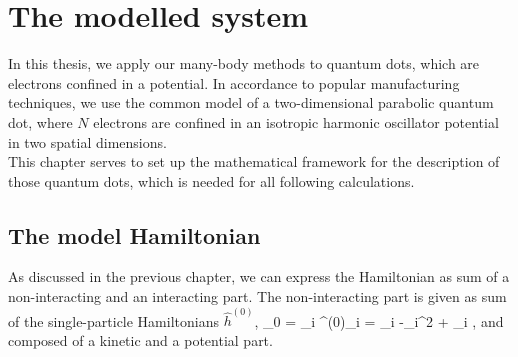 \chapter{The modelled system}
\label{chap:qdots}
In this thesis, we apply our many-body methods to quantum dots, which are electrons confined in a potential. In accordance to popular manufacturing techniques, we use the common model of a two-dimensional parabolic quantum dot,  where $N$ electrons are confined in an isotropic harmonic oscillator potential in two spatial dimensions.\\
 This chapter serves to set up the mathematical framework for the description of those quantum dots, which is needed for all following calculations.

\section{The model Hamiltonian}
\label{sec:ModHam}
As discussed in the previous chapter, we can express the Hamiltonian as sum of a non-interacting and an interacting part. The non-interacting part is given as sum of the single-particle Hamiltonians $\hat{h}^{(0)}$, 
\be
{}_0 = \sum_i ^{(0)}_i = \sum_i \lb -\nabla_i^2 + _{i} \rb,
\label{eq:ho}
\ee
and composed of a kinetic and a potential part. 

